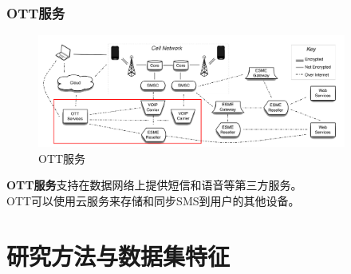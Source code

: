\documentclass[10pt,aspectratio=43,mathserif]{beamer}
\begin{document}
        \begin{frame}
		  \frametitle{\textbf{OTT服务}}
			\begin{figure}[!t]
            \centering
            \includegraphics[width=4in]{figures/figure3.png}
            \caption{OTT服务}
            \label{figure3_OTT}
            \end{figure}
            \textbf{OTT服务}支持在数据网络上提供短信和语音等第三方服务。\\
            OTT可以使用云服务来存储和同步SMS到用户的其他设备。
		\end{frame}



\section[方法]{研究方法与数据集特征}
\end{document}
